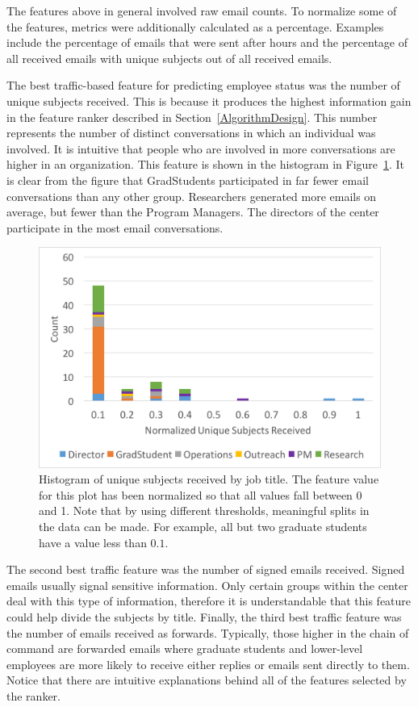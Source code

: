 \documentclass[12pt]{report}
\begin{document}
The features above in general involved raw email counts.
To normalize some of the features, metrics were additionally calculated as a percentage.
Examples include the percentage of emails that were sent after hours and the percentage of all received emails with unique subjects out of all received emails.

The best traffic-based feature for predicting employee status was the number of unique subjects received.
This is because it produces the highest information gain in the feature ranker described in Section~\ref{AlgorithmDesign}.
This number represents the number of distinct conversations in which an individual was involved.
It is intuitive that people who are involved in more conversations are higher in an organization.
This feature is shown in the histogram in Figure~\ref{fig:traffic_ex_hist}.
It is clear from the figure that GradStudents participated in far fewer email conversations than any other group.
Researchers generated more emails on average, but fewer than the Program Managers.
The directors of the center participate in the most email conversations. 
\begin{figure}[t]
    \centering
        \includegraphics[width=\columnwidth,trim={1mm 20mm 1mm 2mm},clip]{Unique_subjects_rec_hist}
        \caption{Histogram of unique subjects received by job title.  The feature value for this plot has been normalized so that all values fall between 0 and 1.  Note that by using different thresholds, meaningful splits in the data can be made.  For example, all but two graduate students have a value less than $0.1$.}
        \label{fig:traffic_ex_hist}
\end{figure}

The second best traffic feature was the number of signed emails received.
Signed emails usually signal sensitive information.
Only certain groups within the center deal with this type of information, therefore it is understandable that this feature could help divide the subjects by title.
Finally, the third best traffic feature was the number of emails received as forwards.
Typically, those higher in the chain of command are forwarded emails where graduate students and lower-level employees are more likely to receive either replies or emails sent directly to them.
Notice that there are intuitive explanations behind all of the features selected by the ranker.
\end{document}
